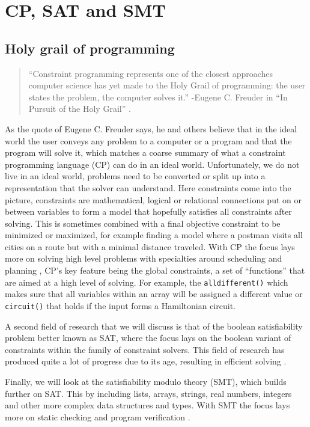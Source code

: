 \chapter{CP, SAT and SMT}
\label{cha:2:CS}
\label{CS:Intro}
\label{CS:HolyGrail}
\section{Holy grail of programming}
\begin{quote}
	“Constraint programming represents one of the closest approaches computer science has yet made to the Holy Grail of programming: the user states the problem, the computer solves it.” 
	\newline
	-Eugene C. Freuder in “In Pursuit of the Holy Grail” \cite{11freuder1997pursuitHolyGrail}.
\end{quote}
As the quote of Eugene C. Freuder says, he and others believe that in the ideal world the user conveys any problem to a computer or a program and that the program will solve it, which matches a coarse summary of what a constraint programming language (CP) can do in an ideal world. Unfortunately, we do not live in an ideal world, problems need to be converted or split up into a representation that the solver can understand. 
Here constraints come into the picture, constraints are mathematical, logical or relational connections put on or between variables to form a model that hopefully satisfies all constraints after solving. This is sometimes combined with a final objective constraint to be minimized or maximized, for example finding a model where a postman visits all cities on a route but with a minimal distance traveled. 
With CP the focus lays more on solving high level problems with specialties around scheduling and planning \cite{52bartak1999constraint}, CP’s key feature being the global constraints, a set of “functions” that are aimed at a high level of solving. For example, the \texttt{alldifferent()} which makes sure that all variables within an array will be assigned a different value or \texttt{circuit()} that holds if the input forms a Hamiltonian circuit.

A second field of research that we will discuss is that of the boolean satisfiability problem better known as SAT, where the focus lays on the boolean variant of constraints within the family of constraint solvers. This field of research has produced quite a lot of progress due to its age, resulting in efficient solving \cite{56bardin2019bringing}.

Finally, we will look at the satisfiability modulo theory (SMT), which builds further on SAT. This by including lists, arrays, strings, real numbers, integers and other more complex data structures and types. With SMT the focus lays more on static checking and program verification \cite{56bardin2019bringing, 54moura2008z3}.


